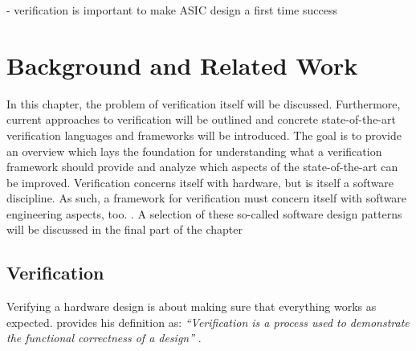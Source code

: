 - verification is important to make ASIC design a first time success \cite[Ch. 3]{bergeron2012writing}

\chapter{Background and Related Work} %
\label{ch:background}

In this chapter, the problem of verification itself will be discussed. Furthermore, current approaches to
verification will be outlined and concrete state-of-the-art verification languages and frameworks will be introduced.
The goal is to provide an overview which lays the foundation for understanding what a verification framework should
provide and analyze which aspects of the state-of-the-art can be improved. Verification concerns itself with
hardware, but is itself a software discipline. As such, a framework for verification must concern itself with
software engineering aspects, too. . A selection of these so-called software design patterns will be discussed in the final part of the chapter

\section{Verification} %

Verifying a hardware design is about making sure that everything works as expected. \citeauthor{bergeron2012writing}
provides his definition as: \textit{``Verification is a process used to demonstrate the functional correctness of a
design''} \cite[Ch. 1]{bergeron2012writing}.

